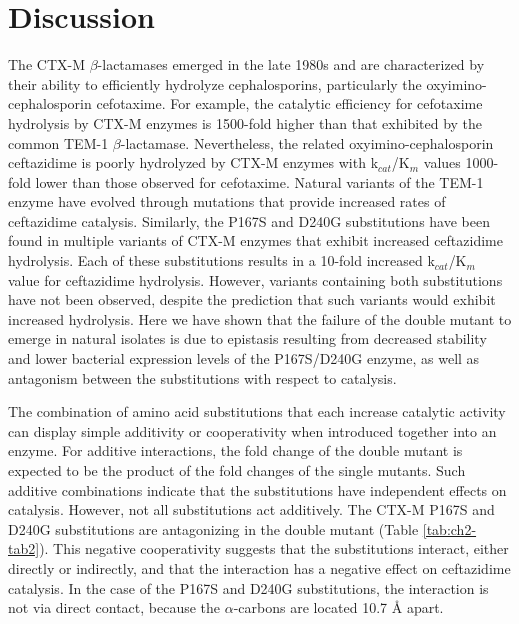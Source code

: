 \documentclass[../main.tex]{subfiles}
\begin{document}
    \section{Discussion}

        The CTX-M $\beta$-lactamases emerged in the late 1980s and are characterized by their ability to efficiently hydrolyze cephalosporins, particularly the oxyimino-cephalosporin cefotaxime\cite{bonnet_growing_2004,dandrea_ctx-m-type_2013}. For example, the catalytic efficiency for cefotaxime hydrolysis by CTX-M enzymes is 1500-fold higher than that exhibited by the common TEM-1 $\beta$-lactamase\cite{palzkill_structural_2018}. Nevertheless, the related oxyimino-cephalosporin ceftazidime is poorly hydrolyzed by CTX-M enzymes with k$_{cat}$/K$_{m}$ values 1000-fold lower than those observed for cefotaxime\cite{palzkill_structural_2018}. Natural variants of the TEM-1 enzyme have evolved through mutations that provide increased rates of ceftazidime catalysis. Similarly, the P167S and D240G substitutions have been found in multiple variants of CTX-M enzymes that exhibit increased ceftazidime hydrolysis\cite{dandrea_ctx-m-type_2013,bonnet_effect_2003,kimura_role_2004,canton_ctx-m_2012,cartelle_high-level_2004}. Each of these substitutions results in a 10-fold increased k$_{cat}$/K$_{m}$ value for ceftazidime hydrolysis\cite{chen_atomic_2005,patel_characterization_2015}. However, variants containing both substitutions have not been observed, despite the prediction that such variants would exhibit increased hydrolysis. Here we have shown that the failure of the double mutant to emerge in natural isolates is due to epistasis resulting from decreased stability and lower bacterial expression levels of the P167S/D240G enzyme, as well as antagonism between the substitutions with respect to catalysis.

        The combination of amino acid substitutions that each increase catalytic activity can display simple additivity or cooperativity when introduced together into an enzyme\cite{wells_additivity_1990}. For additive interactions, the fold change of the double mutant is expected to be the product of the fold changes of the single mutants. Such additive combinations indicate that the substitutions have independent effects on catalysis\cite{wells_additivity_1990}. However, not all substitutions act additively. The CTX-M P167S and D240G substitutions are antagonizing in the double mutant (Table \ref{tab:ch2-tab2}). This negative cooperativity suggests that the substitutions interact, either directly or indirectly, and that the interaction has a negative effect on ceftazidime catalysis\cite{wells_additivity_1990}. In the case of the P167S and D240G substitutions, the interaction is not via direct contact, because the $\alpha$-carbons are located 10.7 \AA{} apart.
\end{document}

